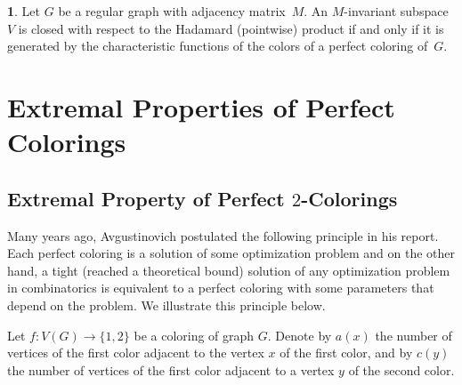 \documentclass[11pt]{article}
\theoremstyle{definition}
\newtheorem{exercise}{\quad}
\begin{document}
\begin{exercise}\label{1p:Pot04b}
 Let $G$ be a regular graph with adjacency matrix~$M$.
An $M$-invariant subspace~$V$ is closed with respect to the Hadamard (pointwise) product if and only if it is generated by
the characteristic functions of the colors of a perfect coloring of~$G$.
\end{exercise}

\section{Extremal Properties of Perfect Colorings}


\subsection{Extremal Property of Perfect $2$-Colorings}


Many years ago, Avgustinovich  postulated the following
principle in his report. Each perfect coloring is a solution of some optimization
problem and on the other hand, a tight (reached a theoretical bound)
solution of any optimization problem in combinatorics is equivalent
to a perfect coloring with some parameters that depend on the
problem. We illustrate this principle below.

Let $f:V(G)\rightarrow \{1,2\}$ be a coloring
of graph $G$. Denote by $a(x)$ the number of vertices
of the first color adjacent to the vertex $x$ of the first color,
and by $c(y)$ the number of vertices of the first color adjacent to  a vertex $y$ of the second color.
\end{document}
